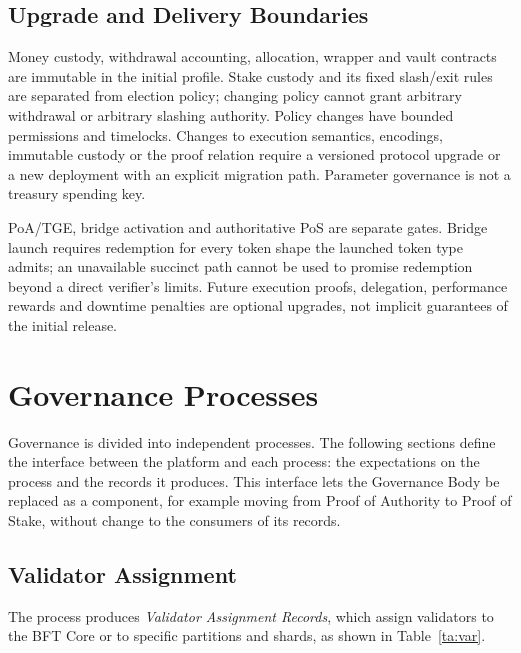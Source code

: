 \section{Upgrade and Delivery Boundaries}\label{sec:gov-delivery}

Money custody, withdrawal accounting, allocation, wrapper and vault contracts are immutable in the initial profile. Stake custody and its fixed slash/exit rules are separated from election policy; changing policy cannot grant arbitrary withdrawal or arbitrary slashing authority. Policy changes have bounded permissions and timelocks. Changes to execution semantics, encodings, immutable custody or the proof relation require a versioned protocol upgrade or a new deployment with an explicit migration path. Parameter governance is not a treasury spending key.

PoA/TGE, bridge activation and authoritative PoS are separate gates. Bridge launch requires redemption for every token shape the launched token type admits; an unavailable succinct path cannot be used to promise redemption beyond a direct verifier's limits. Future execution proofs, delegation, performance rewards and downtime penalties are optional upgrades, not implicit guarantees of the initial release.

\chapter{Governance Processes}\label{ch:gov-processes}

Governance is divided into independent processes. The following sections define the interface between the platform and each process: the expectations on the process and the records it produces. This interface lets the Governance Body be replaced as a component, for example moving from Proof of Authority to Proof of Stake, without change to the consumers of its records.

\section{Validator Assignment}\label{sec:gov-validator-assignment}

The process produces \emph{Validator Assignment Records}, which assign validators to the BFT Core or to specific partitions and shards, as shown in Table~\ref{ta:var}.

